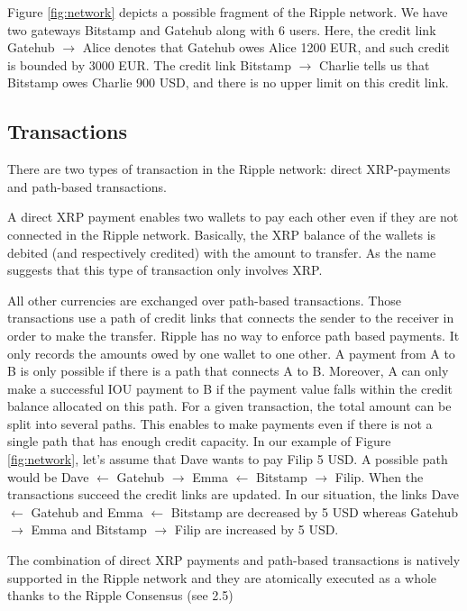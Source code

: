 Figure \ref{fig:network} depicts a possible fragment of the Ripple network. We have two gateways Bitstamp and Gatehub along with 6 users. Here, the credit link Gatehub $\rightarrow$ Alice denotes that Gatehub owes Alice 1200 EUR, and such credit is bounded by 3000 EUR. The credit link Bitstamp $\rightarrow$ Charlie tells us that Bitstamp owes Charlie 900 USD, and there is no upper limit on this credit link.

\subsection{Transactions}
There are two types of transaction in the Ripple network: direct XRP-payments and path-based transactions.

A direct XRP payment enables two wallets to pay each other even if they are not connected in the Ripple network. Basically, the XRP balance of the wallets is debited (and respectively credited) with the amount to transfer. As the name suggests that this type of transaction only involves XRP. 

All other currencies are exchanged over path-based transactions. Those transactions use a path of credit links that connects the sender to the receiver in order to make the transfer. Ripple has no way to enforce path based payments. It only records the amounts owed by one wallet to one other. A payment from A to B is only possible if there is a path that connects A to B. Moreover, A can only make a successful IOU payment to B if the payment value falls within the credit balance allocated on this path. For a given transaction, the total amount can be split into several paths. This enables to make payments even if there is not a single path that has enough credit capacity. In our example of Figure \ref{fig:network}, let's assume that Dave wants to pay Filip 5 USD. A possible path would be Dave $\leftarrow$ Gatehub $\rightarrow$ Emma $\leftarrow$ Bitstamp $\rightarrow$ Filip. When the transactions succeed the credit links are updated. In our situation, the links Dave $\leftarrow$ Gatehub and Emma $\leftarrow$ Bitstamp are decreased by 5 USD whereas Gatehub $\rightarrow$ Emma and Bitstamp $\rightarrow$ Filip are increased by 5 USD.

The combination of direct XRP payments and path-based transactions is natively supported in the Ripple network and they are atomically executed as a whole thanks to the Ripple Consensus (see 2.5)


